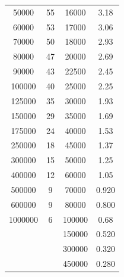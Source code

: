 \begin{table}
\begin{tabular}{c c | c c}
    50000   &  55  &  16000  &  3.18 \\
    60000   &  53  &  17000  &  3.06 \\
    70000   &  50  &  18000  &  2.93 \\
    80000   &  47  &  20000  &  2.69 \\
    90000   &  43  &  22500  &  2.45 \\
    100000  &  40  &  25000  &  2.25 \\
    125000  &  35  &  30000  &  1.93 \\
    150000  &  29  &  35000  &  1.69 \\
    175000  &  24  &  40000  &  1.53 \\
    250000  &  18  &  45000  &  1.37 \\
    300000  &  15  &  50000  &  1.25 \\
    400000  &  12  &  60000  &  1.05 \\
    500000  &  9   &  70000  &  0.920 \\
    600000  &  9   &  80000  &  0.800 \\
    1000000 &  6   &  100000 &  0.68  \\
            &      &  150000 &  0.520 \\
            &      &  300000 &  0.320 \\
            &      &  450000 &  0.280 \\
    \bottomrule
  \end{tabular}
\end{table}

